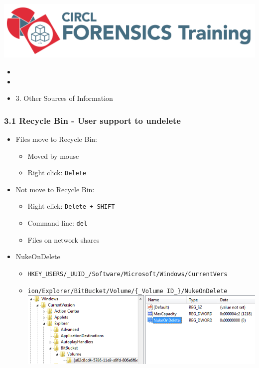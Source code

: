 %
%



\begin{frame}
    \includegraphics[scale=.3]{images/logo-circl-Forensics.png}
    \begin{itemize}
        \item[]
        \item[]
        \item[] 3. Other Sources of Information
    \end{itemize}
\end{frame}


\begin{frame}[fragile]
  \frametitle{3.1 Recycle Bin - User support to undelete}
    \begin{itemize}
        \item Files move to Recycle Bin:
            \begin{itemize}
                \item Moved by mouse
		\item Right click: \texttt{Delete}
            \end{itemize}
        \item Not move to Recycle Bin:
            \begin{itemize}
		    \item Right click: \texttt{Delete + SHIFT}
		    \item Command line: \texttt{del}
		\item Files on network shares
            \end{itemize}
        \item NukeOnDelete
            \begin{itemize}
		    \item \texttt{HKEY\_USERS/\_UUID\_/Software/Microsoft/Windows/CurrentVers}
		    \item[]\texttt{ion/Explorer/BitBucket/Volume/\{\_Volume ID\_\}/NukeOnDelete}
                    \includegraphics[scale=.3]{images/nukeOD.png}
            \end{itemize}
    \end{itemize}
\end{frame}


